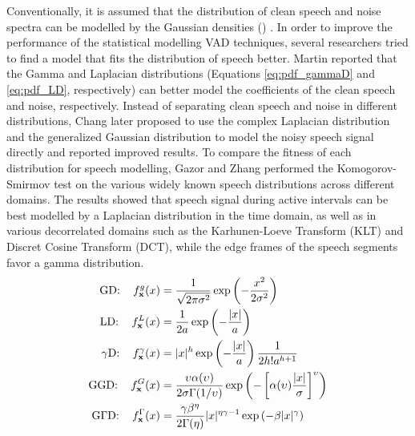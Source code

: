 Conventionally, it is assumed that the distribution of clean speech and noise spectra can be modelled by the Gaussian densities () \cite{sohn1998voice,sohn1999statistical,cho2001improved,ramirez2005statistical,ramirez2007improved}. In order to improve the performance of the statistical modelling VAD techniques, several researchers tried to find a model that fits the distribution of speech better. Martin \cite{martin2002speech} reported that the Gamma and Laplacian distributions (Equations \ref{eq:pdf_gammaD} and \ref{eq:pdf_LD}, respectively) can better model the coefficients of the clean speech and noise, respectively. Instead of separating clean speech and noise in different distributions, Chang \etal \cite{chang2003voice,chang2004voice} later proposed to use the complex Laplacian distribution \cite{chang2003voice} and the generalized Gaussian distribution \cite{chang2004voice} to model the noisy speech signal directly and reported improved results. To compare the fitness of each distribution for speech modelling, Gazor and Zhang \cite{gazor2003speech} performed the Komogorov-Smirmov test \cite{reininger1983distributions} on the various widely known speech distributions across different domains. The results showed that speech signal during active intervals can be best modelled by a Laplacian distribution in the time domain, as well as in various decorrelated domains such as the Karhunen-Loeve Transform (KLT) and Discret Cosine Transform (DCT), while the edge frames of the speech segments favor a gamma distribution.
\begin{align}
	\operatorname{GD:} \quad  f^g_{\mathbf{x}}(x) &= \frac{1}{\sqrt{2\pi\sigma^2}} \exp \left( -\frac{x^2}{2\sigma^2} \right) \label{eq:pdf_GD} \\
	\operatorname{LD:} \quad  f^L_{\mathbf{x}}(x) &= \frac{1}{2a} \exp \left(-\frac{|x|}{a} \right) \label{eq:pdf_LD} \\
	\operatorname{\gamma D:} \quad  f^\gamma_{\mathbf{x}}(x) &= |x|^h \exp \left(-\frac{|x|}{a} \right) \frac{1}{2h!a^{h+1}} \label{eq:pdf_gammaD} \\
	\operatorname{GGD:} \quad  f^{G}_{\mathbf{x}}(x) &= \frac{\upsilon\alpha(\upsilon)}{2\sigma\Gamma(1/\upsilon)} \exp \left(-\left[\alpha(\upsilon)\frac{|x|}{\sigma}\right]^\upsilon \right) \label{eq:pdf_GGD} \\
	\operatorname{G\Gamma D:} \quad  f^\Gamma_{\mathbf{x}}(x) &= \frac{\gamma\beta^\eta}{2\Gamma(\eta)}|x|^{\eta\gamma-1}\exp\left(-\beta|x|^\gamma\right) \label{eq:pdf_GgammaD}
\end{align}

